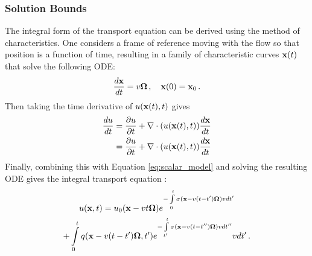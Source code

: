 
\subsubsection{Solution Bounds}\label{sec:solution_bounds}

The integral form of the transport equation can be derived using the method
of characteristics. One considers a frame of reference moving with the flow
so that position is a function of time, resulting in a family of characteristic curves
$\mathbf{x}(t)$ that solve the following ODE:
\begin{equation}
  \frac{d\mathbf{x}}{dt}=v\mathbf{\Omega}\,, \quad \mathbf{x}(0)=\mathbf{x}_0\,.
\end{equation}
Then taking the time derivative of $u(\mathbf{x}(t),t)$ gives
\begin{align}
  \frac{du}{dt} & = \frac{\partial u}{\partial t} + \nabla\cdot(u(\mathbf{x}(t),t))\frac{d\mathbf{x}}{dt}\\
    & =  \frac{\partial u}{\partial t} + \nabla\cdot(u(\mathbf{x}(t),t))\frac{d\mathbf{x}}{dt}
\end{align}
Finally, combining this with Equation \eqref{eq:scalar_model} and solving
the resulting ODE gives the integral transport equation \cite{glasstone}:
\begin{multline}\label{eq:integral_transport}
   u(\mathbf{x},t) = u_0(\mathbf{x} - v t\mathbf{\Omega}) e^{-\int\limits_0^t
    \sigma(\mathbf{x} - v(t -t')\mathbf{\Omega})v dt'}\\
    + \int\limits_0^t q(\mathbf{x} - v(t -t')\mathbf{\Omega},t') e^{-\int\limits_{t'}^t
    \sigma(\mathbf{x} - v(t -{t''})\mathbf{\Omega})v d{t''}} v dt' \,.
\end{multline}

